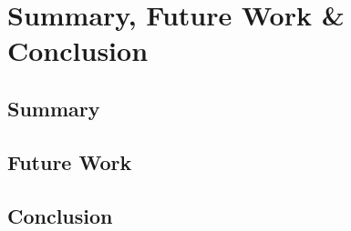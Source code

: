 \chapter{Summary, Future Work \& Conclusion\label{chap:conclusion}}

\section{Summary}

\section{Future Work}

\section{Conclusion}